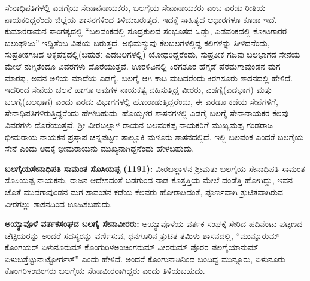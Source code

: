 ಸೇನಾಧಿಪತಿಗಳಲ್ಲಿ ಎಡಗೈಯ ಸೇನಾನನಾಯಕರು, ಬಲಗೈಯ ಸೇನಾನಾಯಕರು ಎಂಬ ಎರಡು ರೀತಿಯ ನಾಯಕರಿದ್ದ\-ರೆಂದು ಜಿಲ್ಲೆಯ ಶಾಸನಗಳಿಂದ ತಿಳಿದುಬರುತ್ತದೆ. ಇದಕ್ಕೆ ಸಾಹಿತ್ಯದ ಆಧಾರಗಳೂ ಕೂಡಾ ಇದೆ. ಕುಮಾರರಾಮನ ಸಾಂಗತ್ಯದಲ್ಲಿ “ಬಲವಂಕದಲ್ಲಿ ಶೂದ್ರಕುಲದ ಸಂಭೂತದ ಒಡ್ಡು, ಎಡವಂಕದಲ್ಲಿ ಕೋಟಗಾರರ ಬಲುಫೌಜು” ಇದ್ದಿತೆಂಬ ವಿಷಯ ಬರುತ್ತದೆ. ಅಭಿಮನ್ಯುವು ಕೆಲಬಲಗಳಲ್ಲಿದ್ದ ಕಲಿಗಳನ್ನು ಸೀಳಿದನೆಂದು, ಸುಪ್ರತೀಕಗಜದ ಅಕ್ಕಪಕ್ಕದಲ್ಲಿ\break (ಬಹುಶಃ ಎಡಬಲಗಳಲ್ಲಿ) ಯೋಧರಿದ್ದರೆಂದು, ಸುಪ್ರತೀಕ ಗಜವು ಬಲಭಾಗದ ಸೇನೆಯ ಮೇಲೆ ನುಗ್ಗಿತೆಂದೂ ವಿವರಗಳು ದೊರೆಯುತ್ತವೆ. ಊರಳಿವಿನಲ್ಲಿ ಕಿರಗತೂರ ಹೆಗ್ಗಡೆ ಪೆರಮಗಾವುಂಡನ ಮಗ ಮಾರಪ್ಪ, ಅವನ ಅಳಿಯ ಮಾದೆಯ ಎಡಗೈ, ಬಲಗೈ ಆಗಿ ಕಾದಿ ಮಡಿದರೆಂದು ಕಿರಗಸೂರು ಶಾಸನದಲ್ಲಿ ಹೇಳಿದೆ. ಇದರಿಂದ ಸೇನೆಯ ಚಲನೆ ಹಾಗೂ ಅವುಗಳ ನಾಯಕತ್ವ ವಹಿಸುತ್ತಿದ್ದ ವೀರರು, ಎಡಗೈ(ಎಡಭಾಗ) ಮತ್ತು ಬಲಗೈ(ಬಲಭಾಗ) ಎಂದು ಎರಡು ವಿಭಾಗಗಳಲ್ಲಿ ಹೋರಾಡುತ್ತಿದ್ದರೆಂದು, ಈ ಎರಡೂ ಕಡೆಯ ಸೇನೆಗಳಿಗೆ, ಸೇನಾಧಿಪತಿಗಳಿರುತ್ತಿದ್ದರೆಂದು ಹೇಳಬಹುದು. ಹೊಯ್ಸಳರ ಶಾಸನಗಳಲ್ಲಿ ಎಡಗೈ ಬಲಗೈ ಸೇನಾನಾಯಕರ ಕೆಲವು ವಿವರಗಳು ದೊರೆಯುತ್ತವೆ. ಶ‍್ರೀ ವೀರಬಲ್ಲಾಳ ರಾಯನ ಬಲವಂಕಪ್ಪ ನಾಯಕರಿಗೆ ಮುಖ್ಯಮಪ್ಪ ಗಂಡರಾಜ ಭೀಮರಾಯ ನಾಯಕನ ಪ್ರಸ್ತಾಪ ಚನ್ನಪಟ್ಟಣ ತಾಲ್ಲೂಕಿ ಮಳೂರು ಶಾಸನದಲ್ಲಿದೆ. ಇಲ್ಲಿ ಬಲವಂಕ ಎಂದರೆ ಬಲಗೈಯ ಸೇನೆ ಎಂದು ಅದಕ್ಕೆ ಭೀಮರಾಯನು ಮುಖ್ಯನಾಗಿದ್ದನೆಂದು ಹೇಳಬಹುದು.

\vskip 2pt

\textbf{ಬಲಗೈಯಸೇನಾಧಿಪತಿ ಸಾಮಂತ ಸೊಸಿಯಪ್ಪ (1191):} ವೀರಬಲ್ಲಾಳನ ಶ‍್ರೀಮತು ಬಲಗೈಯ ಸೇನಾಧಿಪತಿ ಸಾಮಂತ ಸೊಸಿಯಪ್ಪ ನಾಯಕನು, ರಾಜನ ಆದೇಶದಂತೆ ಬಡಗುಂದ ನಾಡ ಕೊತ್ತತ್ತಿಯ ಮೇಲೆ ದಂಡೆತ್ತಿ ಹೋಗಿದ್ದು, ಇವನ ಜೊತೆ ಮುದಗಾವುಂಡನ ಮಗ ಸಾವಂತನ ಕಡೆಯ ಕೆಲವರು ಹೋರಾಡಿದಂತೆ, ಪೂರ್ಣವಾಗಿ ತ್ರುಟಿತವಾಗಿರುವ ವೀರಗಲ್ಲು ಶಾಸನದಿಂದ ಊಹಿಸಬಹುದು.

\vskip 2pt

\textbf{ಅಯ್ಯಾವೊಳೆ ವರ್ತಕಸಂಘದ ಬಲಗೈ ಸೇನಾವೀರರು:} ಅಯ್ಯಾವೊಳೆಯ ವರ್ತಕ ಸಂಘಕ್ಕೆ ಸೇರಿದ ಹದಿನೆಂಟು ಪಟ್ಟಣದ ಚೆಟ್ಟಿಯರನ್ನು ಅಂದರೆ ಸದಸ್ಯರನ್ನು ವರ್ಣಿಸುವ, ಧನಗೂರಿನ ತ್ರುಟಿತ ತಮಿಳು ಶಾಸನದಲ್ಲಿ, “ಮುನ್ನೂರುಮ್ ಕೊಂಗಯರ್​ ಏಳುನೂರುಮ್ ಕೊಂಗುರಿಳಅಂಚಿಂಗರುಮ್ ವೀರರುಮ್ ಪೊರರ ಪಲಗೈಯಾನುಮ್ ಏಳುಬತ್ತೆಟ್ಟು\break ನಾಟ್ಟೋರ್ಗಳ್​” ಎಂದು ಹೇಳಿದೆ. ಅಂದರೆ ಕೊಂಗುನಾಡಿನಿಂದ ಬಂದಿದ್ದ ಮುನ್ನೂರು, ಏಳುನೂರು ಕೊಂಗರಿಳಂಚಿಂಗರು ಬಲಗೈಯ ಸೇನಾವೀರರಾಗಿದ್ದರು ಎಂದು ತಿಳಿಯಬಹುದು.

